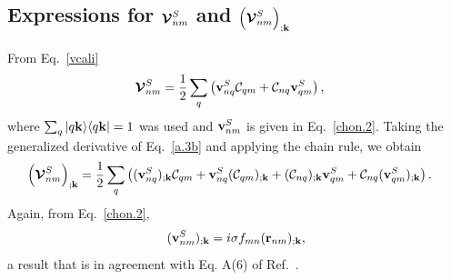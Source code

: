 \documentclass[floatfix,prb,aps,superscriptaddress,11pt,preprint,letterpaper]{revtex4}
\def\chon{black}
\begin{document}
\subsection{Expressions for  \texorpdfstring{$\boldsymbol{\mathcal{\cal V}}^{S}_{nm}$}{Vnm}
and
\texorpdfstring{$\Big({\boldsymbol{\mathcal{\cal V}}}^{S}_{nm}\Big)_{;\mathbf{k}}$}{(Vnm);kb}
}\label{calvs} 

From Eq.~\eqref{vcali}
\begin{align}\label{a.3b}
\boldsymbol{\mathcal{\cal V}}^{S}_{nm}
&=
\frac{1}{2}\sum_q\left(   
\mathbf{v}^S_{nq}{\mathbf{\cal C}}_{qm}+{\mathbf{\cal C}}_{nq}\mathbf{v}^S_{qm}
\right)  
,
\end{align}    
where $\sum_q| q\mathbf{k} \rangle\langle q\mathbf{k} |=1$ was used
{\color{\chon} and $\mathbf{v}^S_{nm}$ is} given in Eq.~\eqref{chon.2}.
Taking the generalized derivative of Eq.~\eqref{a.3b}
{\color{\chon} and} applying
the chain rule, we obtain
\begin{align}\label{a.3bn}
\left(\boldsymbol{\mathcal{\cal V}}^{S}_{nm}\right)_{;\mathbf{k}}
&=
\frac{1}{2}\sum_q\left(
(\mathbf{v}^S_{nq})_{;\mathbf{k}}{\mathbf{\cal C}}_{qm}
+    
\mathbf{v}^S_{nq}({\mathbf{\cal C}}_{qm})_{;\mathbf{k}}
+
({\mathbf{\cal C}}_{nq})_{;\mathbf{k}} \mathbf{v}^S_{qm}
+
{\mathbf{\cal C}}_{nq} (\mathbf{v}^S_{qm})_{;\mathbf{k}}
\right)  
.
\end{align}    
Again, from
Eq.~\eqref{chon.2}, 
\begin{align}\label{choni.1}
(\mathbf{v}^S_{nm})_{;\mathbf{k}}=i\sigma f_{mn}
(\mathbf{r}_{nm})_{;\mathbf{k}}
,
\end{align}
a result that is in agreement with Eq. A(6) of Ref.~.

\newpage
% 
\end{document}
